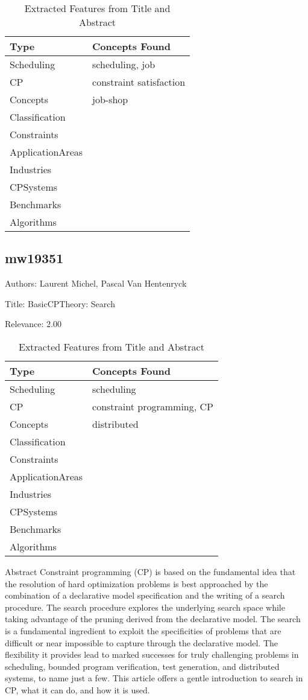 {\scriptsize
\begin{longtable}{p{2cm}p{20cm}}
\caption{Extracted Features from Title and Abstract}\\ \toprule
Type & Concepts Found\\ \midrule
\endhead
\bottomrule
\endfoot
Scheduling & scheduling, job\\ 
CP & constraint satisfaction\\ 
Concepts & job-shop\\ 
Classification & \\ 
Constraints & \\ 
ApplicationAreas & \\ 
Industries & \\ 
CPSystems & \\ 
Benchmarks & \\ 
Algorithms & \\ 
\end{longtable}
}



\subsection{mw19351}
\label{mw:mw19351}

Authors: Laurent Michel, Pascal Van Hentenryck

Title: BasicCPTheory: Search

Relevance:  2.00

{\scriptsize
\begin{longtable}{p{2cm}p{20cm}}
\caption{Extracted Features from Title and Abstract}\\ \toprule
Type & Concepts Found\\ \midrule
\endhead
\bottomrule
\endfoot
Scheduling & scheduling\\ 
CP & constraint programming, CP\\ 
Concepts & distributed\\ 
Classification & \\ 
Constraints & \\ 
ApplicationAreas & \\ 
Industries & \\ 
CPSystems & \\ 
Benchmarks & \\ 
Algorithms & \\ 
\end{longtable}
}

 Abstract  Constraint programming (CP) is based on the fundamental idea that the resolution of hard optimization problems is best approached by the combination of a declarative model specification and the writing of a search procedure. The search procedure explores the underlying search space while taking advantage of the pruning derived from the declarative model. The search is a fundamental ingredient to exploit the specificities of problems that are difficult or near impossible to capture through the declarative model. The flexibility it provides lead to marked successes for truly challenging problems in scheduling, bounded program verification, test generation, and distributed systems, to name just a few. This article offers a gentle introduction to search in CP, what it can do, and how it is used. 

